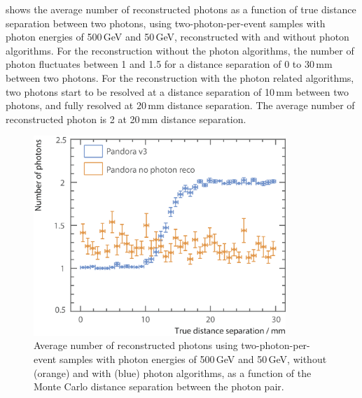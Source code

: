 
 shows the average number of reconstructed photons as a function of true distance separation between two photons,   using  two-photon-per-event samples
with photon energies of  500\,GeV and 50\,GeV,   reconstructed with and without photon algorithms. For the reconstruction without the photon algorithms, the number of photon fluctuates between 1 and 1.5 for a distance separation of 0 to 30\,mm between two photons.  For the reconstruction with the photon related algorithms, two photons start to be resolved at a distance separation  of 10\,mm between two photons, and fully resolved at 20\,mm distance separation.  The average number of reconstructed photon is 2 at 20\,mm distance separation.


\begin{figure}[!tbph]
\centering
\includegraphics[width=0.85\textwidth]{photon/nPhotonVSnoPhotonReco3}
\caption[Average number of photons using two photons of 500 and 50\,GeV per event sample.]
{Average number of reconstructed  photons using two-photon-per-event samples with photon energies of  500\,GeV and 50\,GeV, without (orange) and with (blue) photon algorithms, as a function of the Monte Carlo distance separation between the photon pair.}
\label{fig:photonDoublePerformanceNoReco}
\end{figure}




